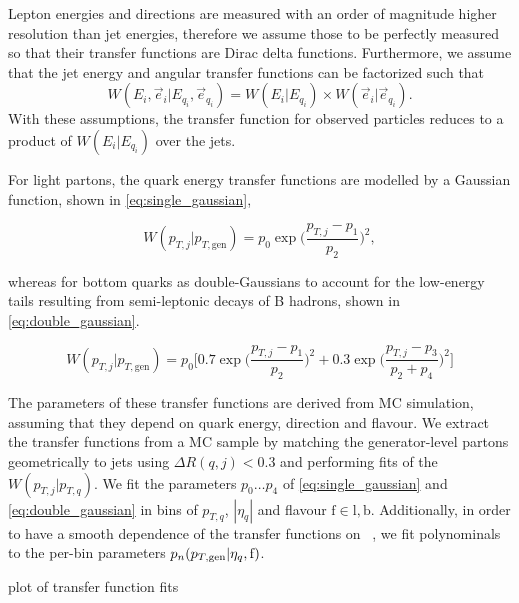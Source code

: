 Lepton energies and directions are measured with an order of magnitude higher resolution than jet energies, therefore we assume those to be perfectly measured so that their transfer functions are Dirac delta functions.
Furthermore, we assume that the jet energy and angular transfer functions can be factorized such that
\begin{equation}
W(E_i, \vec{e}_i | E_{q_i}, \vec{e}_{q_i}) = W(E_i | E_{q_i}) \times W(\vec{e}_i | \vec{e}_{q_i}).
\end{equation}
With these assumptions, the transfer function for observed particles reduces to a product of $W(E_i | E_{q_i})$ over the jets.

For light partons, the quark energy transfer functions are modelled by a Gaussian function, shown in \cref{eq:single_gaussian}, 

\begin{equation}
\label{eq:single_gaussian}
W(p_{T,j} | p_{T,\mathrm{gen}}) = p_0 \exp{\biggl(\frac{p_{T,j} - p_1}{p_2}\biggr)^2},
\end{equation}

whereas for bottom quarks as double-Gaussians to account for the low-energy tails resulting from semi-leptonic decays of B hadrons, shown in \cref{eq:double_gaussian}.

\begin{equation}
\label{eq:double_gaussian}
W(p_{T,j} | p_{T,\mathrm{gen}}) = p_0 \biggl[0.7\exp{\biggl(\frac{p_{T,j} - p_1}{p_2}\biggr)^2} + 0.3\exp{\biggl(\frac{p_{T,j} - p_3}{p_2+p_4}\biggr)^2}\biggr]
\end{equation}

The parameters of these transfer functions are derived from MC simulation, assuming that they depend on quark energy, direction and flavour. We extract the transfer functions from a \ttbar MC sample by matching the generator-level partons geometrically to jets using $\Delta R(q,j) < 0.3$ and performing fits of the $W(p_{T,j}|p_{T,q})$. We fit the parameters $p_0 \dots p_4$ of \cref{eq:single_gaussian} and \cref{eq:double_gaussian} in bins of $p_{T,q}$, $|\eta_{q}|$ and flavour $\mathrm{f}\in{\mathrm{l}, \mathrm{b}}$. Additionally, in order to have a smooth dependence of the transfer functions on \ptgen~, we fit polynominals to the per-bin parameters $p_n(p_{T,\mathrm{gen}}|\eta_{q},\mathrm{f})$.

\fix plot of transfer function fits



